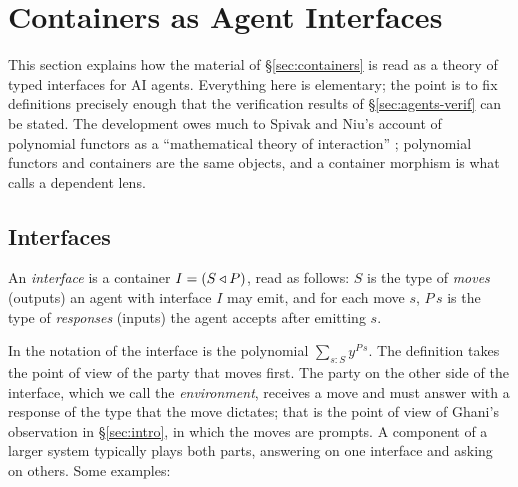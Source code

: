 \documentclass{fundam}
\begin{document}
\section{Containers as Agent Interfaces}\label{sec:agents}

This section explains how the material of \S\ref{sec:containers} is read as a theory of
typed interfaces for AI agents.  Everything here is elementary; the point is to fix
definitions precisely enough that the verification results of \S\ref{sec:agents-verif}
can be stated.  The development owes much to Spivak and Niu's account of polynomial
functors as a ``mathematical theory of interaction'' \cite{Spivak20,NiuSpivak25}; polynomial
functors and containers are the same objects, and a container morphism is what
\cite{NiuSpivak25} calls a dependent lens.

\subsection{Interfaces}\label{sec:interfaces}

\begin{definition}[Interface]\label{def:interface}
  An \emph{interface} is a container $I = (S \triangleleft P)$, read as follows: $S$ is the type
  of \emph{moves} (outputs) an agent with interface $I$ may emit, and for each move $s$,
  $P\,s$ is the type of \emph{responses} (inputs) the agent accepts after emitting $s$.
\end{definition}

In the notation of \cite{NiuSpivak25} the interface is the polynomial
$\sum_{s:S} y^{P\,s}$.  The definition takes the point of view of the party that moves
first.  The party on the other side of the interface, which we call the
\emph{environment}, receives a move and must answer with a response of the type that the
move dictates; that is the point of view of Ghani's observation in \S\ref{sec:intro}, in
which the moves are prompts.  A component of a larger system typically plays both parts,
answering on one interface and asking on others.  Some examples:
\end{document}
